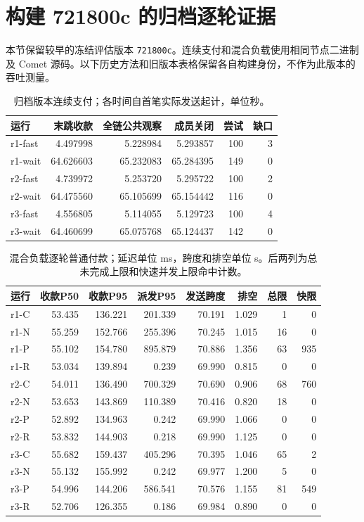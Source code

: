 \section{构建 721800c 的归档逐轮证据}
\label{sec:supp-current}
本节保留较早的冻结评估版本 \texttt{721800c}。连续支付和混合负载使用相同节点二进制及 Comet 源码。以下历史方法和旧版本表格保留各自构建身份，不作为此版本的吞吐测量。

\begin{table}[htbp]
\centering\small
\caption{归档版本连续支付；各时间自首笔实际发送起计，单位秒。}
\label{tab:supp-final-chain}
\begin{tabular}{@{}lrrrrr@{}}
\toprule
运行 & 末跳收款 & 全链公共观察 & 成员关闭 & 尝试 & 缺口 \\
\midrule
r1-fast & 4.497998 & 5.228984 & 5.293857 & 100 & 3 \\
r1-wait & 64.626603 & 65.232083 & 65.284395 & 149 & 0 \\
r2-fast & 4.739972 & 5.253720 & 5.295722 & 100 & 2 \\
r2-wait & 64.475560 & 65.105699 & 65.154442 & 116 & 0 \\
r3-fast & 4.556805 & 5.114055 & 5.129723 & 100 & 4 \\
r3-wait & 64.460699 & 65.075768 & 65.124437 & 142 & 0 \\
\bottomrule
\end{tabular}
\end{table}
\begin{table}[htbp]
\centering\small
\caption{混合负载逐轮普通付款；延迟单位 ms，跨度和排空单位 s。后两列为总未完成上限和快速并发上限命中计数。}
\label{tab:supp-final-mixed}
\begin{tabular}{@{}lrrrrrrr@{}}
\toprule
运行 & 收款P50 & 收款P95 & 派发P95 & 发送跨度 & 排空 & 总限 & 快限 \\
\midrule
r1-C & 53.435 & 136.221 & 201.339 & 70.191 & 1.029 & 1 & 0 \\
r1-N & 55.259 & 152.766 & 255.396 & 70.245 & 1.015 & 16 & 0 \\
r1-P & 55.102 & 154.780 & 895.879 & 70.886 & 1.356 & 63 & 935 \\
r1-R & 53.034 & 139.894 & 0.239 & 69.990 & 0.815 & 0 & 0 \\
r2-C & 54.011 & 136.490 & 700.329 & 70.690 & 0.906 & 68 & 760 \\
r2-N & 53.653 & 143.869 & 110.389 & 70.416 & 0.820 & 18 & 0 \\
r2-P & 52.892 & 134.963 & 0.242 & 69.990 & 1.066 & 0 & 0 \\
r2-R & 53.832 & 144.903 & 0.218 & 69.990 & 1.125 & 0 & 0 \\
r3-C & 55.682 & 159.437 & 405.296 & 70.395 & 1.046 & 65 & 2 \\
r3-N & 55.132 & 155.992 & 0.242 & 69.977 & 1.200 & 5 & 0 \\
r3-P & 54.996 & 144.206 & 586.541 & 70.576 & 1.155 & 81 & 549 \\
r3-R & 52.706 & 126.355 & 0.186 & 69.984 & 0.890 & 0 & 0 \\
\bottomrule
\end{tabular}
\end{table}
